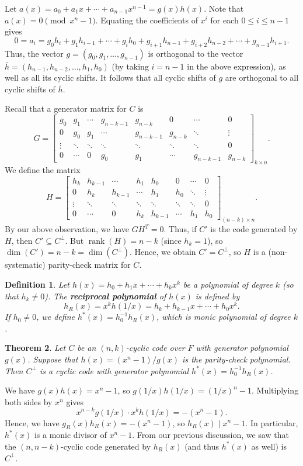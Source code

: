\documentclass[10pt]{article}
\makeatletter
\DeclareMathOperator{\rank}{rank}
\theoremstyle{newstyle}
\newtheorem{thm}{Theorem}[subsection]
\newtheorem{defn}[thm]{Definition}
\newenvironment{pf}[1][\proofname]{\par
  \pushQED{\qed}%
  \normalfont \topsep0\p@\relax
  \trivlist
  \item[\hskip\labelsep\scshape
  #1\@addpunct{.}]\ignorespaces
}{%
  \popQED\endtrivlist\@endpefalse
}
\makeatother
\begin{document}
Let $a(x) = a_0 + a_1 x + \cdots + a_{n-1} x^{n-1} = g(x) h(x)$. Note that 
$a(x) = 0 \pmod{x^n - 1}$. Equating the coefficients of $x^i$ for each $0 \leq i \leq n-1$ gives 
\[ 0 = a_i = g_0h_i + g_1h_{i-1} + \cdots + g_ih_0 + g_{i+1} h_{n-1} + g_{i+2} h_{n-2} 
+ \cdots + g_{n-1} h_{i+1}. \]
Thus, the vector $g = (g_0, g_1, \dots, g_{n-1})$ is orthogonal to the vector $\bar{h} 
= (h_{n-1}, h_{n-2}, \dots, h_1, h_0)$ (by taking $i = n-1$ in the above expression), 
as well as all its cyclic shifts. It follows that all cyclic shifts of $g$ are orthogonal to 
all cyclic shifts of $\bar{h}$. 

Recall that a generator matrix for $C$ is 
\[ G = 
\begin{bmatrix}
g_0 & g_1 & \cdots & g_{n-k-1} & g_{n-k} & 0 & \cdots & 0 \\ 
0 & g_0 & g_1 & \cdots & g_{n-k-1} & g_{n-k} & \ddots & \vdots \\ 
\vdots & \ddots & \ddots & \ddots & \ddots & \ddots & \ddots & 0 \\
0 & \cdots & 0 & g_0 & g_1 & \cdots & g_{n-k-1} & g_{n-k} 
\end{bmatrix}_{k \times n}. \]
We define the matrix 
\[ H = 
\begin{bmatrix}
h_k & h_{k-1} & \cdots & h_1 & h_0 & 0 & \cdots & 0 \\ 
0 & h_k & h_{k-1} & \cdots & h_1 & h_0 & \ddots & \vdots \\ 
\vdots & \ddots & \ddots & \ddots & \ddots & \ddots & \ddots & 0 \\
0 & \cdots & 0 & h_k & h_{k-1} & \cdots & h_1 & h_0 
\end{bmatrix}_{(n-k) \times n}. \]
By our above observation, we have $GH^T = 0$. Thus, if $C'$ is the code generated by 
$H$, then $C' \subseteq C^\perp$. But $\rank(H) = n-k$ (since $h_k = 1$), so 
$\dim(C') = n-k = \dim(C^\perp)$. Hence, we obtain $C' = C^\perp$, so $H$ is a 
(non-systematic) parity-check matrix for $C$. 

\begin{defn}
Let $h(x) = h_0 + h_1x + \cdots + h_k x^k$ be a polynomial of degree $k$ (so that $h_k \neq 0$). 
The {\bf reciprocal polynomial} of $h(x)$ is defined by 
\[ h_R(x) = x^k h(1/x) = h_k + h_{k-1} x + \cdots + h_0 x^k. \]
If $h_0 \neq 0$, we define $h^*(x) = h_0^{-1} h_R(x)$, which is monic polynomial of degree $k$. 
\end{defn}

\begin{thm}
Let $C$ be an $(n, k)$-cyclic code over $F$ with generator polynomial $g(x)$. 
Suppose that $h(x) = (x^n-1)/g(x)$ is the parity-check polynomial.
Then $C^\perp$ is a cyclic code with generator polynomial 
$h^*(x) = h_0^{-1} h_R(x)$. 
\end{thm}
\begin{pf}
We have $g(x)h(x) = x^n - 1$, so $g(1/x)h(1/x) = (1/x)^n - 1$. Multiplying both sides by $x^n$ gives 
\[ x^{n-k} g(1/x) \cdot x^k h(1/x) = -(x^n - 1). \]
Hence, we have $g_R(x) h_R(x) = -(x^n - 1)$, so $h_R(x) \mid x^n - 1$. In particular, 
$h^*(x)$ is a monic divisor of $x^n - 1$. From our previous discussion, we saw that the $(n, 
n-k)$-cyclic code generated by $h_R(x)$ (and thus $h^*(x)$ as well) is $C^\perp$.
\end{pf}
\end{document}
